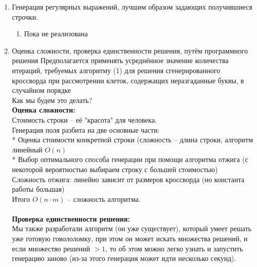 \documentclass[12pt]{article}
\begin{document}
\begin{enumerate}
\newpage

\item Генерация регулярных выражений, лучшим образом задающих получившиеся строчки.
\begin{enumerate} 
\item Пока не реализована
\end{enumerate} 

\newpage

\item Оценка сложности, проверка единственности решения, путём программного решения
        Предполагается применять усреднённое значение количества итераций, требуемых алгоритму (1) для решения сгенерированного кроссворда при рассмотрении клеток, содержащих неразгаданные буквы, в случайном порядке
        \\
        
        Как мы будем это делать? \\
        {\bf Оценка сложности: } \\
        Стоимость строки -- её "красота" для человека. \\
        Генерация поля разбита на две основные части: \\
        * Оценка стоимости конкретной строки (сложность -- длина строки, алгоритм линейный $O(n)$ \\
        * Выбор оптимального способа генерации при помощи алгоритма отжига (с некоторой вероятностью выбираем строку с большей стоимостью) \\
        Сложность отжига: линейно зависит от размеров кроссворда (но константа работы большая) \\
        Итого $O(n \cdot m)$ -- сложность алгоритма. \\
        \\
        {\bf Проверка единственности решения: } \\
        Мы также разработали алгоритм (он уже существует), который умеет решать уже готовую говололомку, 
        при этом он может искать множества решений, и если множество решений $>1$, то об этом можно легко узнать 
        и запустить генерацию заново (из-за этого генерация может идти несколько секунд).
        

\end{enumerate}


    \newpage %
    
\end{document}
